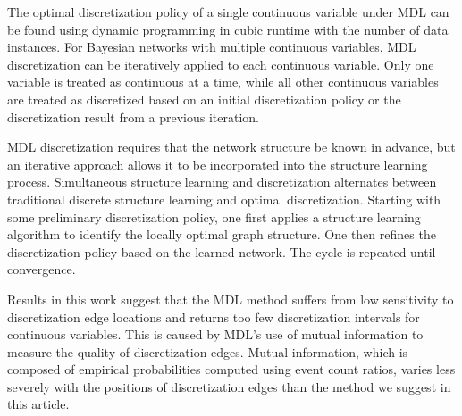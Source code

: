 The optimal discretization policy of a single continuous variable under MDL can be found using dynamic programming in cubic runtime with the number of data instances.
For Bayesian networks with multiple continuous variables, MDL discretization can be iteratively applied to each continuous variable.
Only one variable is treated as continuous at a time, while all other continuous variables are treated as discretized based on an initial discretization policy or the discretization result from a previous iteration.

MDL discretization requires that the network structure be known in advance, but an iterative approach allows it to be incorporated into the structure learning process.
Simultaneous structure learning and discretization alternates between traditional discrete structure learning and optimal discretization.
Starting with some preliminary discretization policy, one first applies a structure learning algorithm to identify the locally optimal graph structure.
One then refines the discretization policy based on the learned network.
The cycle is repeated until convergence.

Results in this work suggest that the MDL method suffers from low sensitivity to discretization edge locations and returns too few discretization intervals for continuous variables.
This is caused by MDL's use of mutual information to measure the quality of discretization edges.
Mutual information, which is composed of empirical probabilities computed using event count ratios, varies less severely with the positions of discretization edges than the method we suggest in this article.





